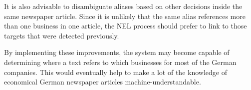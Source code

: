 It is also advisable to disambiguate aliases based on other decisions inside the same newspaper article. Since it is unlikely that the same alias references more than one business in one article, the NEL process should prefer to link to those targets that were detected previously.

By implementing these improvements, the system may become capable of determining where a text refers to which businesses for most of the German companies. This would eventually help to make a lot of the knowledge of economical German newspaper articles machine-understandable.